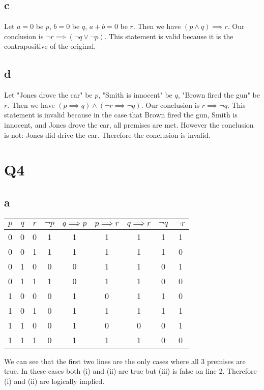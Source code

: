 \documentclass[12pt]{article}
\begin{document}
\subsection{c}
Let $a = 0$ be $p$, $b = 0$ be $q$, $a+b =0$ be $r$.
\newline
Then we have $(p \land q) \implies r$. Our conclusion is $\neg r \implies (\neg q \lor \neg p)$.
\newline
This statement is valid because it is the contrapositive of the original.

\subsection{d}
Let "Jones drove the car" be $p$, "Smith is innocent" be $q$, 
"Brown fired the gun" be $r$.
\newline
Then we have $(p \implies q) \land (\neg r \implies \neg q)$. Our conclusion is $r \implies \neg q$.
\newline
This statement is invalid because in the case that Brown fired the gun, Smith is innocent, and Jones drove the car, 
all premises are met. However the conclusion is not: Jones did drive the car. Therefore the conclusion 
is invalid.


\section{Q4}
\subsection{a}
\begin{tabular}{ | c | c | c | c | c | c | c | c | c |}
    \hline
    $p$ & $q$ & $r$ & $\neg p$ & $q \implies p$ & $p \implies r$ & $q \implies r $ & $\neg q$ & $\neg r$\\
    \hline
    0 & 0 & 0 & 1 & 1 & 1 & 1 & 1 & 1\\
    \hline
    0 & 0 & 1 & 1 & 1 & 1 & 1 & 1 & 0\\
    \hline
    0 & 1 & 0 & 0 & 0 & 1 & 1 & 0 & 1\\
    \hline
    0 & 1 & 1 & 1 & 0 & 1 & 1 & 0 & 0\\
    \hline
    1 & 0 & 0 & 0 & 1 & 0 & 1 & 1 & 0\\
    \hline
    1 & 0 & 1 & 0 & 1 & 1 & 1 & 1 & 1\\
    \hline
    1 & 1 & 0 & 0 & 1 & 0 & 0 & 0 & 1\\
    \hline
    1 & 1 & 1 & 0 & 1 & 1 & 1 & 0 & 0\\
    \hline
\end{tabular}
\newline
We can see that the first two lines are the only cases where all 3 premises are true. 
In these cases both (i) and (ii) are true but (iii) is false on line 2. Therefore (i) 
and (ii) are logically implied.
\end{document}
